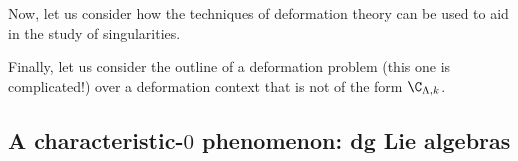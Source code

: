         Now, let us consider how the techniques of deformation theory can be used to aid in the study of singularities. 
        \begin{example}
            
        \end{example}

        Finally, let us consider the outline of a deformation problem (this one is complicated!) over a deformation context that is not of the form $\C_{\Lambda, k}$.
        \begin{example}
            
        \end{example}

    \subsection{A characteristic-$0$ phenomenon: dg Lie algebras}